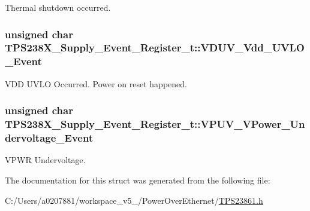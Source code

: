 Thermal shutdown occurred. 

\hypertarget{struct_t_p_s238_x___supply___event___register__t_abab65a098bb6bdcb452e96dbf4aca4e6}{
\subsubsection[{V\-D\-U\-V\-\_\-\-Vdd\-\_\-\-U\-V\-L\-O\-\_\-\-Event}]{\setlength{\rightskip}{0pt plus 5cm}unsigned char T\-P\-S238\-X\-\_\-\-Supply\-\_\-\-Event\-\_\-\-Register\-\_\-t\-::\-V\-D\-U\-V\-\_\-\-Vdd\-\_\-\-U\-V\-L\-O\-\_\-\-Event}}\label{struct_t_p_s238_x___supply___event___register__t_abab65a098bb6bdcb452e96dbf4aca4e6}


V\-D\-D U\-V\-L\-O Occurred. Power on reset happened. 

\hypertarget{struct_t_p_s238_x___supply___event___register__t_ac6fcee7fc4bb8175466aebc576b07772}{
\subsubsection[{V\-P\-U\-V\-\_\-\-V\-Power\-\_\-\-Undervoltage\-\_\-\-Event}]{\setlength{\rightskip}{0pt plus 5cm}unsigned char T\-P\-S238\-X\-\_\-\-Supply\-\_\-\-Event\-\_\-\-Register\-\_\-t\-::\-V\-P\-U\-V\-\_\-\-V\-Power\-\_\-\-Undervoltage\-\_\-\-Event}}\label{struct_t_p_s238_x___supply___event___register__t_ac6fcee7fc4bb8175466aebc576b07772}


V\-P\-W\-R Undervoltage. 



The documentation for this struct was generated from the following file\-:\begin{DoxyCompactItemize}
\item 
C\-:/\-Users/a0207881/workspace\-\_\-v5\-\_/\-Power\-Over\-Ethernet/\hyperlink{_t_p_s23861_8h}{T\-P\-S23861.\-h}\end{DoxyCompactItemize}
